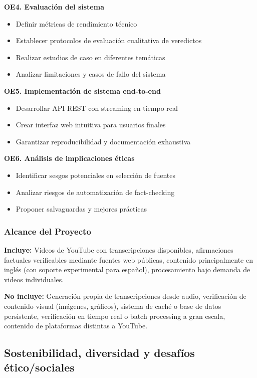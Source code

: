 \documentclass[12pt,a4paper,twoside]{book}
\begin{document}
\textbf{OE4. Evaluación del sistema}
\begin{itemize}
    \item Definir métricas de rendimiento técnico
    \item Establecer protocolos de evaluación cualitativa de veredictos
    \item Realizar estudios de caso en diferentes temáticas
    \item Analizar limitaciones y casos de fallo del sistema
\end{itemize}

\textbf{OE5. Implementación de sistema end-to-end}
\begin{itemize}
    \item Desarrollar API REST con streaming en tiempo real
    \item Crear interfaz web intuitiva para usuarios finales
    \item Garantizar reproducibilidad y documentación exhaustiva
\end{itemize}

\textbf{OE6. Análisis de implicaciones éticas}
\begin{itemize}
    \item Identificar sesgos potenciales en selección de fuentes
    \item Analizar riesgos de automatización de fact-checking
    \item Proponer salvaguardas y mejores prácticas
\end{itemize}

\subsubsection{Alcance del Proyecto}

\textbf{Incluye:} Videos de YouTube con transcripciones disponibles, afirmaciones factuales verificables mediante fuentes web públicas, contenido principalmente en inglés (con soporte experimental para español), procesamiento bajo demanda de videos individuales.

\textbf{No incluye:} Generación propia de transcripciones desde audio, verificación de contenido visual (imágenes, gráficos), sistema de caché o base de datos persistente, verificación en tiempo real o batch processing a gran escala, contenido de plataformas distintas a YouTube.

\subsection{Sostenibilidad, diversidad y desafíos ético/sociales}
\end{document}
